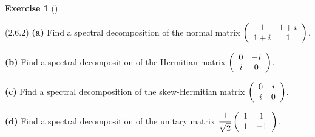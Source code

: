 \documentclass[numbers=enddot,12pt,final,onecolumn,notitlepage]{scrartcl}
\newcounter{exer}
\theoremstyle{definition}
\newtheorem{exmp}[exer]{Exercise}
\newenvironment{exercise}[1][]
{\begin{exmp}[#1]\begin{leftbar}}
        {\end{leftbar}\end{exmp}}
\begin{document}
\begin{exercise}
	\label{exe.schurtri.normal.examples} (2.6.2) \textbf{(a)} Find a spectral
	decomposition of the normal matrix $\left(
		\begin{array}
				[c]{cc}%
				1   & 1+i \\
				1+i & 1
			\end{array}
		\right)  $. \medskip

	\textbf{(b)} Find a spectral decomposition of the Hermitian matrix $\left(
		\begin{array}
				[c]{cc}%
				0 & -i \\
				i & 0
			\end{array}
		\right)  $. \medskip

	\textbf{(c)} Find a spectral decomposition of the skew-Hermitian matrix
	$\left(
		\begin{array}
				[c]{cc}%
				0 & i \\
				i & 0
			\end{array}
		\right)  $. \medskip

	\textbf{(d)} Find a spectral decomposition of the unitary matrix $\dfrac
		{1}{\sqrt{2}}\left(
		\begin{array}
				[c]{cc}%
				1 & 1  \\
				1 & -1
			\end{array}
		\right)  $.
\end{exercise}
\end{document}
